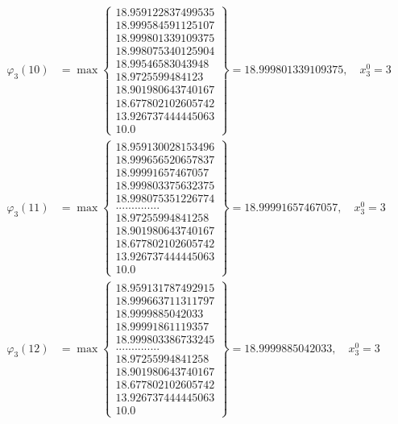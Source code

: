 \documentclass{article}
\begin{document}
\begin{align*}
  
  
  
\varphi_{3}(10) &= \max \left\{ \begin{array}{c}
18.959122837499535 \\
 18.999584591125107 \\
 18.999801339109375 \\
 18.998075340125904 \\
 18.99546583043948 \\
 18.9725599484123 \\
 18.901980643740167 \\
 18.677802102605742 \\
 13.926737444445063 \\
 10.0
\end{array} \right\} = 18.999801339109375, \quad x_{3}^0 = 3\\
  
  
  
  
\varphi_{3}(11) &= \max \left\{ \begin{array}{c}
18.959130028153496 \\
 18.999656520657837 \\
 18.99991657467057 \\
 18.999803375632375 \\
 18.998075351226774 \\
 .............. \\
 18.97255994841258 \\
 18.901980643740167 \\
 18.677802102605742 \\
 13.926737444445063 \\
 10.0
\end{array} \right\} = 18.99991657467057, \quad x_{3}^0 = 3\\
  
  
  
  
\varphi_{3}(12) &= \max \left\{ \begin{array}{c}
18.959131787492915 \\
 18.999663711311797 \\
 18.9999885042033 \\
 18.99991861119357 \\
 18.999803386733245 \\
 .............. \\
 18.97255994841258 \\
 18.901980643740167 \\
 18.677802102605742 \\
 13.926737444445063 \\
 10.0
\end{array} \right\} = 18.9999885042033, \quad x_{3}^0 = 3\\
  

\end{align*}
\end{document}
